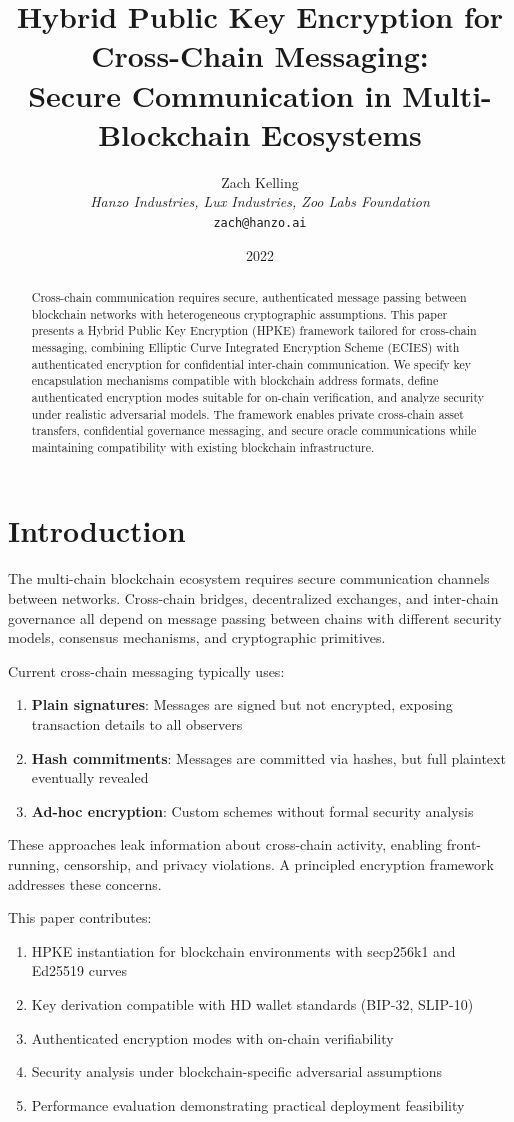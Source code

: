 \documentclass[11pt,a4paper]{article}
\title{Hybrid Public Key Encryption for Cross-Chain Messaging:\\Secure Communication in Multi-Blockchain Ecosystems}
\author{Zach Kelling\\
\textit{Hanzo Industries, Lux Industries, Zoo Labs Foundation}\\
\texttt{zach@hanzo.ai}}
\date{2022}
\begin{document}
\maketitle

\begin{abstract}
Cross-chain communication requires secure, authenticated message passing between blockchain networks with heterogeneous cryptographic assumptions. This paper presents a Hybrid Public Key Encryption (HPKE) framework tailored for cross-chain messaging, combining Elliptic Curve Integrated Encryption Scheme (ECIES) with authenticated encryption for confidential inter-chain communication. We specify key encapsulation mechanisms compatible with blockchain address formats, define authenticated encryption modes suitable for on-chain verification, and analyze security under realistic adversarial models. The framework enables private cross-chain asset transfers, confidential governance messaging, and secure oracle communications while maintaining compatibility with existing blockchain infrastructure.
\end{abstract}

\section{Introduction}

The multi-chain blockchain ecosystem requires secure communication channels between networks. Cross-chain bridges, decentralized exchanges, and inter-chain governance all depend on message passing between chains with different security models, consensus mechanisms, and cryptographic primitives.

Current cross-chain messaging typically uses:
\begin{enumerate}
    \item \textbf{Plain signatures}: Messages are signed but not encrypted, exposing transaction details to all observers
    \item \textbf{Hash commitments}: Messages are committed via hashes, but full plaintext eventually revealed
    \item \textbf{Ad-hoc encryption}: Custom schemes without formal security analysis
\end{enumerate}

These approaches leak information about cross-chain activity, enabling front-running, censorship, and privacy violations. A principled encryption framework addresses these concerns.

This paper contributes:
\begin{enumerate}[noitemsep]
    \item HPKE instantiation for blockchain environments with secp256k1 and Ed25519 curves
    \item Key derivation compatible with HD wallet standards (BIP-32, SLIP-10)
    \item Authenticated encryption modes with on-chain verifiability
    \item Security analysis under blockchain-specific adversarial assumptions
    \item Performance evaluation demonstrating practical deployment feasibility
\end{enumerate}
\end{document}
